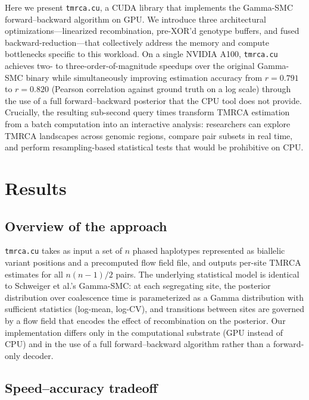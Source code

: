 \documentclass[10pt,letterpaper]{article}
\begin{document}
Here we present \texttt{tmrca.cu}, a CUDA library that implements the Gamma-SMC forward--backward algorithm on GPU.
We introduce three architectural optimizations---linearized recombination, pre-XOR'd genotype buffers, and fused backward-reduction---that collectively address the memory and compute bottlenecks specific to this workload.
On a single NVIDIA A100, \texttt{tmrca.cu} achieves two- to three-order-of-magnitude speedups over the original Gamma-SMC binary while simultaneously improving estimation accuracy from $r=0.791$ to $r=0.820$ (Pearson correlation against ground truth on a log scale) through the use of a full forward--backward posterior that the CPU tool does not provide.
Crucially, the resulting sub-second query times transform TMRCA estimation from a batch computation into an interactive analysis: researchers can explore TMRCA landscapes across genomic regions, compare pair subsets in real time, and perform resampling-based statistical tests that would be prohibitive on CPU.

\section*{Results}

\subsection*{Overview of the approach}

\texttt{tmrca.cu} takes as input a set of $n$ phased haplotypes represented as biallelic variant positions and a precomputed flow field file, and outputs per-site TMRCA estimates for all $n(n-1)/2$ pairs.
The underlying statistical model is identical to Schweiger et al.'s Gamma-SMC: at each segregating site, the posterior distribution over coalescence time is parameterized as a Gamma distribution with sufficient statistics (log-mean, log-CV), and transitions between sites are governed by a flow field that encodes the effect of recombination on the posterior.
Our implementation differs only in the computational substrate (GPU instead of CPU) and in the use of a full forward--backward algorithm rather than a forward-only decoder.

\subsection*{Speed--accuracy tradeoff}
\end{document}
